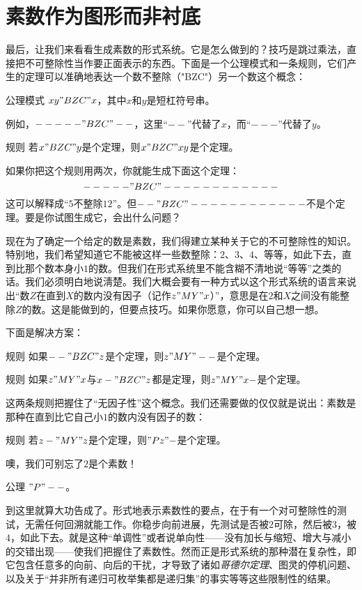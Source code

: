 \section{素数作为图形而非衬底}

最后，让我们来看看生成素数的形式系统。它是怎么做到的？技巧是跳过乘法，直接把不可整除性当作要正面表示的东西。下面是一个公理模式和一条规则，它们产生的定理可以准确地表达一个数不整除（"BZC"）另一个数这个概念：

\begin{thm}{公理模式}
$xy"BZC"x$，其中$x$和$y$是短杠符号串。
\end{thm}
例如，$-----"BZC"--$，这里“$--$”代替了$x$，而“$---$”代替了$y$。

\begin{thm}{规则}
若$x"BZC"y$是个定理，则$x"BZC"xy$是个定理。
\end{thm}

如果你把这个规则用两次，你就能生成下面这个定理：
\[
-----"BZC"------------
\]
这可以解释成“$5$不整除$12$”。但$--"BZC"------------$不是个定理。要是你试图生成它，会出什么问题？

现在为了确定一个给定的数是素数，我们得建立某种关于它的不可整除性的知识。特别地，我们希望知道它不能被这样一些数整除：$2$、$3$、$4$、等等，如此下去，直到比那个数本身小$1$的数。但我们在形式系统里不能含糊不清地说“等等”之类的话。我们必须明白地说淸楚。我们大概会要有一种方式以这个形式系统的语言来说出“数$Z$在直到$X$的数内没有因子（记作$z"MY"x$）”，意思是在$2$和$X$之间没有能整除$Z$的数。这是能做到的，但要点技巧。如果你愿意，你可以自己想一想。

下面是解决方案：

\begin{thm}{规则}
如果$--"BZC"z$是个定理，则$z"MY"--$是个定理。
\end{thm}
\begin{thm}{规则}
如果$z"MY"x$与$x-"BZC"z$都是定理，则$z"MY"x-$是个定理。
\end{thm}
这两条规则把握住了“无因子性”这个概念。我们还需要做的仅仅就是说出：素数是那种在直到比它自己小$1$的数内没有因子的数：

\begin{thm}{规则}
若$z-"MY"z$是个定理，则$"Pz"-$是个定理。
\end{thm}
噢，我们可别忘了$2$是个素数！
\begin{thm}{公理}
$"P"--$。
\end{thm}

到这里就算大功告成了。形式地表示素数性的要点，在于有一个对可整除性的测试，无需任何回溯就能工作。你稳步向前进展，先测试是否被$2$可除，然后被$3$，被$4$，如此下去。就是这种“单调性”或者说单向性——没有加长与缩短、增大与减小的交错出现——使我们把握住了素数性。然而正是形式系统的那种潜在复杂性，即它包含任意多的向前、向后的干扰，才导致了诸如\emph{哥德尔定理}、图灵的停机问题、以及关于“并非所有递归可枚举集都是递归集”的事实等等这些限制性的结果。

